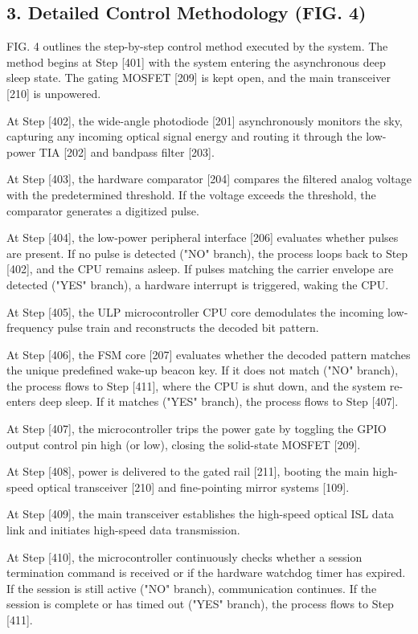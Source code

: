 \documentclass[12pt,a4paper]{article}
\begin{document}
\subsection*{3. Detailed Control Methodology (FIG. 4)}
FIG. 4 outlines the step-by-step control method executed by the system.
The method begins at Step [401] with the system entering the asynchronous deep sleep state. The gating MOSFET [209] is kept open, and the main transceiver [210] is unpowered.

At Step [402], the wide-angle photodiode [201] asynchronously monitors the sky, capturing any incoming optical signal energy and routing it through the low-power TIA [202] and bandpass filter [203].

At Step [403], the hardware comparator [204] compares the filtered analog voltage with the predetermined threshold. If the voltage exceeds the threshold, the comparator generates a digitized pulse.

At Step [404], the low-power peripheral interface [206] evaluates whether pulses are present. If no pulse is detected ("NO" branch), the process loops back to Step [402], and the CPU remains asleep. If pulses matching the carrier envelope are detected ("YES" branch), a hardware interrupt is triggered, waking the CPU.

At Step [405], the ULP microcontroller CPU core demodulates the incoming low-frequency pulse train and reconstructs the decoded bit pattern.

At Step [406], the FSM core [207] evaluates whether the decoded pattern matches the unique predefined wake-up beacon key. If it does not match ("NO" branch), the process flows to Step [411], where the CPU is shut down, and the system re-enters deep sleep. If it matches ("YES" branch), the process flows to Step [407].

At Step [407], the microcontroller trips the power gate by toggling the GPIO output control pin high (or low), closing the solid-state MOSFET [209].

At Step [408], power is delivered to the gated rail [211], booting the main high-speed optical transceiver [210] and fine-pointing mirror systems [109].

At Step [409], the main transceiver establishes the high-speed optical ISL data link and initiates high-speed data transmission.

At Step [410], the microcontroller continuously checks whether a session termination command is received or if the hardware watchdog timer has expired. If the session is still active ("NO" branch), communication continues. If the session is complete or has timed out ("YES" branch), the process flows to Step [411].
\end{document}
